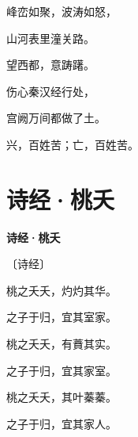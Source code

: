 \documentclass[12pt,UTF-8,openany,fontset=none]{ctexbook}
\begin{document}
    \vspace{18pt}  %

\begin{center}
    \begin{Large}

        峰峦如聚，波涛如怒，

        山河表里潼关路。

        望西都，意踌躇。

        \vspace{18pt}  %

        伤心秦汉经行处，

        宫阙万间都做了土。

        兴，百姓苦；亡，百姓苦。

    \end{Large}

\end{center}

\vspace{8pt}
\clearpage

\section{诗经·桃夭}


\begin{center}
    {\bfseries 诗经·桃夭}

    \vspace{18pt}

    \begin{large}\xuwen
        〔诗经〕
    \end{large}

\end{center}

    \vspace{18pt}  %

\begin{center}
    \begin{Large}

        桃之夭夭，灼灼其华。

        之子于归，宜其室家。

        \vspace{18pt}  %

        桃之夭夭，有蕡其实。

        之子于归，宜其家室。

        \vspace{18pt}  %

        桃之夭夭，其叶蓁蓁。

        之子于归，宜其家人。

    \end{Large}

\end{center}
\end{document}
